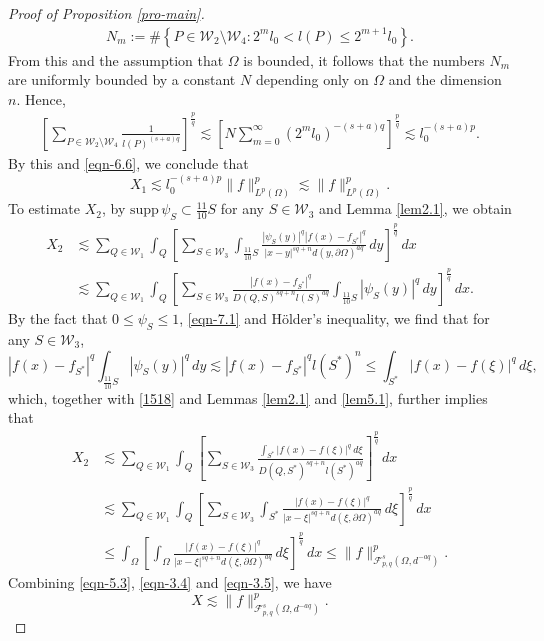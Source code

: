 \documentclass[11pt,twoside]{article}
\def\cf{{\mathcal F}}
\def\cw{\mathcal W}
\def\sxing{S^{*}}
\def\boz{{\Omega}}
\def\pa{\partial}                %
\newcounter{assum}
\theoremstyle{mylem}
\theoremstyle{definition}
\numberwithin{equation}{section}
\begin{document}
\begin{proof}[Proof of Proposition \ref{pro-main}]
\begin{align*}
N_m:=\#\left\{P\in\cw_2\setminus\cw_4:
2^ml_0<l(P)\leq2^{m+1}l_0\right\}.
\end{align*}
From this and the assumption that \(\Omega\) is bounded, it follows that the
numbers \(N_m\) are uniformly bounded by a constant \(N\) depending only
on \(\Omega\) and the dimension \(n\). Hence,
\begin{align}\label{eqn-3.3}
\left[\sum_{P\in\cw_2\setminus\cw_4} \frac{1}{l(P)^{(s+a)q}} \right]^{\frac{p}{q}}
\lesssim \left[N\sum_{m=0}^{\infty}(2^m l_0)^{-(s+a)q}\right]^{\frac pq}
\lesssim l_0^{-(s+a)p}.
\end{align}
By this and \eqref{eqn-6.6}, we conclude that
\begin{equation}\label{eqn-3.4}
X_1\lesssim l_0^{-(s+a)p}\|f\|_{L^{p}(\boz)}^p\lesssim\|f\|_{L^{p}(\boz)}^p.
\end{equation}
To estimate $X_2$, by $\text{supp}\,\psi_S \subset \frac{11}{10}S$ for any $S\in\mathcal{W}_3$ and Lemma \ref{lem2.1}, we obtain
\begin{align}\label{1518}
X_2&\lesssim \sum_{Q\in\cw_1} \int_{Q} \left[ \sum_{S\in\mathcal{W}_3}\int_{\frac{11}{10}S} \frac{ |\psi_S(y)|^q |f(x)- f_{S^{*}}|^q}{|x - y|^{s q + n}d(y,\pa\boz)^{aq}}\,dy \right]^{\frac{p}{q}}\,dx\nonumber\\
&\lesssim \sum_{Q\in\cw_1} \int_{Q} \left[ \sum_{S\in\mathcal{W}_3} \frac{|f(x)- f_{S^{*}}|^q}{D(Q,S)^{s q + n}l(S)^{aq}} \int_{\frac{11}{10}S} |\psi_S(y)|^q\,dy \right]^{\frac{p}{q}}\,dx.
\end{align}
By the fact that $0\leq\psi_S\leq1$,
\eqref{eqn-7.1} and H\"older's inequality, we find that for any $S\in\mathcal{W}_3$,
$$
|f(x)- f_{S^{*}}|^q\int_{\frac{11}{10}S} |\psi_S(y)|^q\,dy\lesssim
|f(x)- f_{S^{*}}|^q l(S^{*})^n
\leq\int_{S^{*}} |f(x)-f(\xi)|^q\,d\xi,
$$
which, together with
\eqref{1518} and Lemmas \ref{lem2.1} and \ref{lem5.1}, further implies that
\begin{align}\label{eqn-3.5}
X_2&\lesssim \sum_{Q\in\cw_1} \int_{Q} \left[ \sum_{S\in\mathcal{W}_3} \frac{\int_{S^{*}} |f(x)-f(\xi)|^q\,d\xi}{D(Q,\sxing)^{s q + n}l(\sxing)^{aq}} \right]^{\frac{p}{q}}\,dx \nonumber \\
&\lesssim \sum_{Q\in\cw_1} \int_{Q} \left[ \sum_{S\in\mathcal{W}_3} \int_{S^{*}} \frac{|f(x)-f(\xi)|^q}{|x - \xi|^{s q + n}d(\xi,\pa\boz)^{aq}}\,d\xi \right]^{\frac{p}{q}}\,dx \nonumber  \\
&\leq \int_{\boz} \left[ \int_{\boz} \frac{| f(x) - f(\xi)|^q}{|x - \xi|^{s q + n}d(\xi,\pa\boz)^{aq}}\,d\xi \right]^{\frac{p}{q}}\,dx
\leq \| f \|_{\cf_{p,q}^{s}(\boz,d^{-aq})}^{p}.
\end{align}
Combining \eqref{eqn-5.3}, \eqref{eqn-3.4} and \eqref{eqn-3.5}, we have
\begin{equation}\label{eqn-3.6}
X\lesssim \| f \|_{\cf_{p,q}^{s}(\boz,d^{-aq})}^{p}.
\end{equation}


\end{proof}
\end{document}
